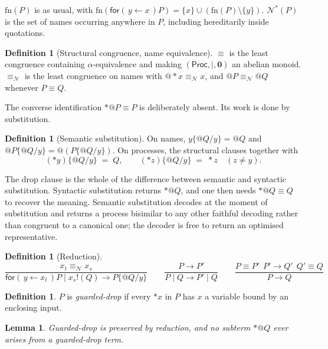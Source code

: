 \documentclass[11pt]{article}
\makeatletter
\theoremstyle{plain}
\newtheorem{lemma}[theorem]{Lemma}
\theoremstyle{definition}
\newtheorem{definition}[theorem]{Definition}
\theoremstyle{remark}
\newcommand{\quo}[1]{@#1}
\newcommand{\drp}[1]{{*}#1}
\newcommand{\inp}[3]{\mathsf{for}(\,#1 \leftarrow #2\,)#3}
\newcommand{\out}[2]{#1!(#2)}
\newcommand{\nil}{\mathbf{0}}
\newcommand{\nequiv}{\equiv_{\mathcal{N}}}
\newcommand{\fn}{\mathrm{fn}}
\newcommand{\nms}[1]{\mathcal{N}^{*}(#1)}
\newcommand{\red}{\longrightarrow}
\newcommand{\scong}{\equiv}
\makeatother
\begin{document}
$\fn(P)$ is as usual, with $\fn(\inp{y}{x}{P}) = \{x\} \cup (\fn(P)\setminus
\{y\})$. $\nms{P}$ is the set of names occurring anywhere in $P$, including
hereditarily inside quotations.

\begin{definition}[Structural congruence, name equivalence]
$\scong$ is the least congruence containing $\alpha$-equivalence and making
$(\mathsf{Proc},\mid,\nil)$ an abelian monoid. $\nequiv$ is the least
congruence on names with $\quo{\drp{x}} \nequiv x$, and $\quo{P} \nequiv
\quo{Q}$ whenever $P \scong Q$.
\end{definition}

The converse identification $\drp{\quo{P}} \scong P$ is deliberately absent.
Its work is done by substitution.

\begin{definition}[Semantic substitution]
\label{def:subst}
On names, $y\{\quo{Q}/y\} = \quo{Q}$ and $\quo{P}\{\quo{Q}/y\} =
\quo{(P\{\quo{Q}/y\})}$. On processes, the structural clauses together with
\[
  (\drp{y})\{\quo{Q}/y\} \;=\; Q,
  \qquad
  (\drp{z})\{\quo{Q}/y\} \;=\; \drp{z}\quad (z \neq y).
\]
\end{definition}

The drop clause is the whole of the difference between semantic and syntactic
substitution. Syntactic substitution returns $\drp{\quo{Q}}$, and one then
needs $\drp{\quo{Q}} \scong Q$ to recover the meaning. Semantic substitution
decodes at the moment of substitution and returns a process bisimilar to any
other faithful decoding rather than congruent to a canonical one; the decoder
is free to return an optimised representative.

\begin{definition}[Reduction]
\[
  \frac{x_{t} \nequiv x_{s}}
       {\inp{y}{x_{t}}{P} \mid \out{x_{s}}{Q} \red P\{\quo{Q}/y\}}
  \qquad
  \frac{P \red P'}{P \mid Q \red P' \mid Q}
  \qquad
  \frac{P \scong P' \ \ P' \red Q' \ \ Q' \scong Q}{P \red Q}
\]
\end{definition}

\begin{definition}
$P$ is \emph{guarded-drop} if every $\drp{x}$ in $P$ has $x$ a variable bound
by an enclosing input.
\end{definition}

\begin{lemma}
\label{lem:guarded}
Guarded-drop is preserved by reduction, and no subterm $\drp{\quo{Q}}$ ever
arises from a guarded-drop term.
\end{lemma}
\end{document}
